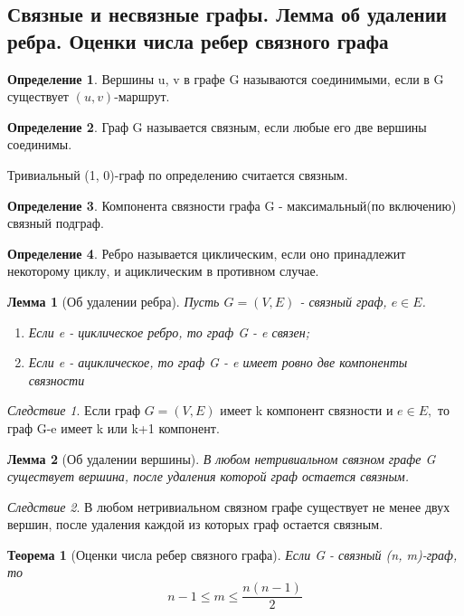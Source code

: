\documentclass[a4paper]{article}
\newtheorem{theorem}{Теорема}[section]
\newtheorem{lemma}{Лемма}[section]
\theoremstyle{definition}
\newtheorem*{definition}{Определение}
\theoremstyle{remark}
\newtheorem*{corollary}{Следствие}
\begin{document}
\begin{multicols*}{2}
    \section{Связные и несвязные графы. Лемма об удалении ребра. Оценки числа ребер связного 
    графа}
    \begin{definition}
        Вершины u, v в графе G называются соединимыми, если в G существует $(u,v)$-маршрут.
    \end{definition}
    \begin{definition}
        Граф G называется связным, если любые его две вершины соединимы. 
    \end{definition}
    Тривиальный (1, 0)-граф по определению считается связным.
    \begin{definition}
        Компонента связности графа G - максимальный(по включению) связный подграф.
    \end{definition}
    \begin{definition}
        Ребро называется циклическим, если оно принадлежит некоторому циклу, и ациклическим в противном случае.
    \end{definition}
    \begin{lemma}[Об удалении ребра]
        Пусть $G = (V, E)$ - связный граф, $e\in E$.
        \begin{enumerate}
            \item Если e - циклическое ребро, то граф G - e связен;
            \item Если e - ациклическое, то граф G - e имеет ровно две компоненты связности
        \end{enumerate}
    \end{lemma}
    \begin{corollary}
        Если граф $G = (V, E)$ имеет k компонент связности и $e\in E,$ то граф G-e имеет k или k+1 компонент.
    \end{corollary}
    \begin{lemma}[Об удалении вершины]
        В любом нетривиальном связном графе G существует вершина, после удаления которой граф остается связным.
    \end{lemma}
    \begin{corollary}
        В любом нетривиальном связном графе существует не менее двух вершин, после удаления каждой из которых граф остается связным.
    \end{corollary}
    \begin{theorem}[Оценки числа ребер связного графа]
        Если G - связный (n, m)-граф, то 
        $$n-1 \leq m \leq \frac{n(n-1)}{2}$$
    \end{theorem}

\end{multicols*}
\end{document}
